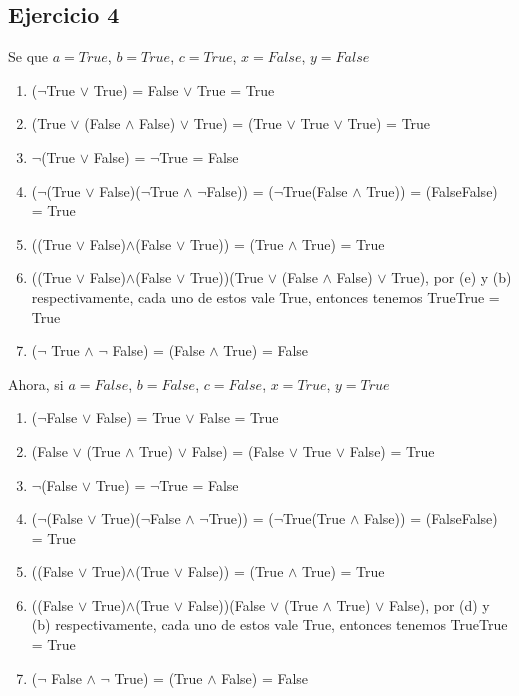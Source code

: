 	\subsection{Ejercicio 4}
	Se que $a = True$, $b = True$, $c = True$, $x = False$, $y = False$
	
	\begin{enumerate}[label=(\alph*)]
		\item ($\neg$True $\vee$ True) = False $\vee$ True = True
		\item (True $\vee$ (False $\wedge$ False) $\vee$ True) = (True $\vee$ True $\vee$ True) = True
		\item $\neg$(True $\vee$ False) = $\neg$True = False
		\item ($\neg$(True $\vee$ False)\Iff($\neg$True $\wedge$ $\neg$False)) = ($\neg$True\Iff(False $\wedge$ True)) = (False\Iff False) = True
		\item ((True $\vee$ False)$\wedge$(False $\vee$ True)) = (True $\wedge$ True) = True
		\item ((True $\vee$ False)$\wedge$(False $\vee$ True))\Iff(True $\vee$ (False $\wedge$ False) $\vee$ True), por (e) y (b) respectivamente, cada uno de estos vale True, entonces tenemos True\Iff True = True
		\item ($\neg$ True $\wedge$ $\neg$ False) = (False $\wedge$ True) = False
	\end{enumerate}
	
	Ahora, si $a = False$, $b = False$, $c = False$, $x = True$, $y = True$
	
	\begin{enumerate}[label=(\alph*)]
		\item ($\neg$False $\vee$ False) = True $\vee$ False = True
		\item (False $\vee$ (True $\wedge$ True) $\vee$ False) = (False $\vee$ True $\vee$ False) = True
		\item $\neg$(False $\vee$ True) = $\neg$True = False
		\item ($\neg$(False $\vee$ True)\Iff($\neg$False $\wedge$ $\neg$True)) = ($\neg$True\Iff(True $\wedge$ False)) = (False\Iff False) = True
		\item ((False $\vee$ True)$\wedge$(True $\vee$ False)) = (True $\wedge$ True) = True
		\item ((False $\vee$ True)$\wedge$(True $\vee$ False))\Iff(False $\vee$ (True $\wedge$ True) $\vee$ False), por (d) y (b) respectivamente, cada uno de estos vale True, entonces tenemos True\Iff True = True
		\item ($\neg$ False $\wedge$ $\neg$ True) = (True $\wedge$ False) = False
	\end{enumerate}
	
